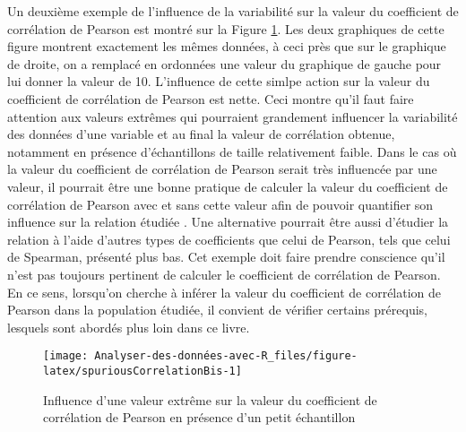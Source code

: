 \documentclass[
  french,
]{book}
\begin{document}
Un deuxième exemple de l'influence de la variabilité sur la valeur du coefficient de corrélation de Pearson est montré sur la Figure \ref{fig:spuriousCorrelationBis}. Les deux graphiques de cette figure montrent exactement les mêmes données, à ceci près que sur le graphique de droite, on a remplacé en ordonnées une valeur du graphique de gauche pour lui donner la valeur de 10. L'influence de cette simlpe action sur la valeur du coefficient de corrélation de Pearson est nette. Ceci montre qu'il faut faire attention aux valeurs extrêmes qui pourraient grandement influencer la variabilité des données d'une variable et au final la valeur de corrélation obtenue, notamment en présence d'échantillons de taille relativement faible. Dans le cas où la valeur du coefficient de corrélation de Pearson serait très influencée par une valeur, il pourrait être une bonne pratique de calculer la valeur du coefficient de corrélation de Pearson avec et sans cette valeur afin de pouvoir quantifier son influence sur la relation étudiée \autocite{halperinSpuriousCorrelationsCauses1986}. Une alternative pourrait être aussi d'étudier la relation à l'aide d'autres types de coefficients que celui de Pearson, tels que celui de Spearman, présenté plus bas. Cet exemple doit faire prendre conscience qu'il n'est pas toujours pertinent de calculer le coefficient de corrélation de Pearson. En ce sens, lorsqu'on cherche à inférer la valeur du coefficient de corrélation de Pearson dans la population étudiée, il convient de vérifier certains prérequis, lesquels sont abordés plus loin dans ce livre.

\begin{figure}

{\centering \texttt{[image: Analyser-des-données-avec-R\_files/figure-latex/spuriousCorrelationBis-1]} 

}

\caption{Influence d'une valeur extrême sur la valeur du coefficient de corrélation de Pearson en présence d'un petit échantillon}\label{fig:spuriousCorrelationBis}
\end{figure}
\end{document}
